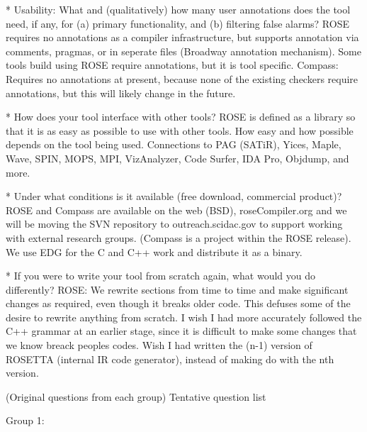 {    * Usability: What and (qualitatively) how many user annotations does the tool need, if
      any, for (a) primary functionality, and (b) filtering false alarms?
      ROSE requires no annotations as a compiler infrastructure, but supports 
         annotation via comments, pragmas, or in seperate files (Broadway annotation
         mechanism).  Some tools build using ROSE require annotations, but it is
         tool specific.
      Compass: Requires no annotations at present, because none of the existing checkers
         require annotations, but this will likely change in the future.

    * How does your tool interface with other tools?
      ROSE is defined as a library so that it is as easy as possible to use with other
         tools.  How easy and how possible depends on the tool being used. Connections 
         to PAG (SATiR), Yices, Maple, Wave, SPIN, MOPS, MPI, VizAnalyzer, Code Surfer,
         IDA Pro, Objdump, and more.

    * Under what conditions is it available (free download, commercial product)?
      ROSE and Compass are available on the web (BSD), roseCompiler.org and we will
         be moving the SVN repository to outreach.scidac.gov to support working with
         external research groups. (Compass is a project within the ROSE release).
         We use EDG for the C and C++ work and distribute it as a binary.

    * If you were to write your tool from scratch again, what would you do differently?
      ROSE: We rewrite sections from time to time and make significant changes as 
         required, even though it breaks older code.  This defuses some of the desire
         to rewrite anything from scratch.  I wish I had more accurately followed
         the C++ grammar at an earlier stage, since it is difficult to make some 
         changes that we know breack peoples codes.  Wish I had written the (n-1)
         version of ROSETTA (internal IR code generator), instead of making do 
         with the nth version.

(Original questions from each group) Tentative question list

Group 1:

}
